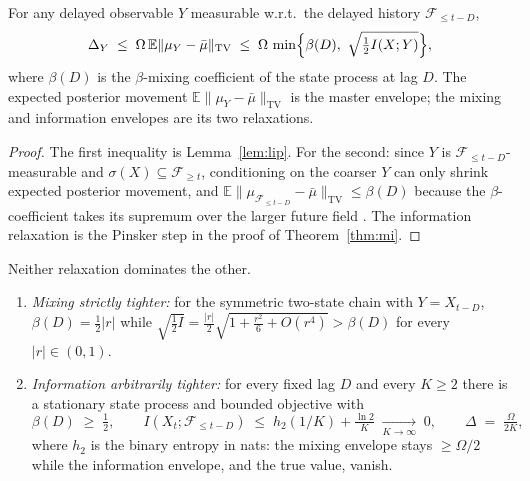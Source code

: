 \documentclass[acmsmall,screen,review,anonymous]{acmart}
\newcommand{\TV}{\mathrm{TV}}
\newcommand{\E}{\mathbb{E}}
\begin{document}
\begin{proposition}\label{prop:order}
For any delayed observable $Y$ measurable w.r.t.\ the delayed history
$\mathcal F_{\le t-D}$,
\[
\Delta_Y
\;\le\;\Omega\,\E\|\mu_Y-\bar\mu\|_{\TV}
\;\le\;\Omega\,\min\Bigl\{\beta(D),\ \sqrt{\tfrac12 I(X;Y)}\Bigr\},
\]
where $\beta(D)$ is the $\beta$-mixing coefficient of the state process at
lag $D$. The expected posterior movement
$\E\|\mu_Y-\bar\mu\|_{\TV}$ is the master envelope; the mixing and
information envelopes are its two relaxations.
\end{proposition}

\begin{proof}
The first inequality is Lemma~\ref{lem:lip}. For the second: since
$Y$ is $\mathcal F_{\le t-D}$-measurable and $\sigma(X)\subseteq
\mathcal F_{\ge t}$, conditioning on the coarser $Y$ can only shrink
expected posterior movement, and
$\E\|\mu_{\mathcal F_{\le t-D}}-\bar\mu\|_{\TV}\le\beta(D)$ because the
$\beta$-coefficient takes its supremum over the larger future field
\cite[App.~A]{infocom}. The information relaxation is the Pinsker step in the
proof of Theorem~\ref{thm:mi}.
\end{proof}

\begin{proposition}\label{prop:incomp}
Neither relaxation dominates the other.
\begin{enumerate}
\item[(i)] \emph{Mixing strictly tighter:} for the symmetric two-state chain
with $Y=X_{t-D}$, $\beta(D)=\tfrac12 |r|$ while
$\sqrt{\tfrac12 I}=\tfrac {|r|}2\sqrt{1+\tfrac{r^2}{6}+O(r^4)}>\beta(D)$ for
every $|r|\in(0,1)$.
\item[(ii)] \emph{Information arbitrarily tighter:} for every fixed lag $D$
and every $K\ge 2$ there is a stationary state process and bounded
objective with
\[
\beta(D)\;\ge\;\tfrac12,
\qquad
I(X_t;\mathcal F_{\le t-D})\;\le\;h_2(1/K)+\tfrac{\ln 2}{K}\;\xrightarrow[K\to\infty]{}\;0,
\qquad
\Delta\;=\;\tfrac{\Omega}{2K},
\]
where $h_2$ is the binary entropy in nats: the mixing envelope stays
$\ge\Omega/2$ while the information envelope, and the true value, vanish.
\end{enumerate}
\end{proposition}
\end{document}
